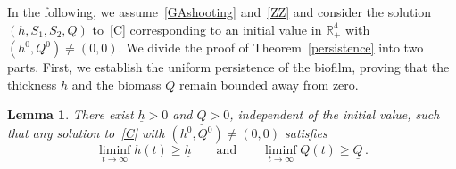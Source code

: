 \documentclass[reqno,11pt]{amsart}
\newtheorem{lem}[thm]{Lemma}
\numberwithin{equation}{section}
\newcommand{\R}{\mathbb{R}}
\begin{document}
 
 In the following, we assume~\eqref{GAshooting} and~\eqref{ZZ} and consider the solution $(h,S_1,S_2,Q)$ to~\eqref{C}  corresponding to an initial value in $\R_+^4$ with $(h^0,Q^0)\not=(0,0)$. We divide the proof of Theorem~\ref{persistence} into two parts. First, we establish the uniform persistence of the biofilm, proving that the thickness $h$ and the biomass $Q$ remain bounded away from zero. 


\begin{lem}\label{Tpersist}
There exist $\underline{h}>0$ and $\underline{Q}>0$, independent of the initial value, such that any solution to~\eqref{C} with $(h^0,Q^0)\not=(0,0)$ satisfies
\begin{equation}\label{persist}
\liminf_{t\to\infty} h(t)\ge\underline{h}\qquad\text{and}\qquad \liminf_{t\to\infty} Q(t)\ge\underline{Q}\,.%
\end{equation}
\end{lem}
\end{document}
